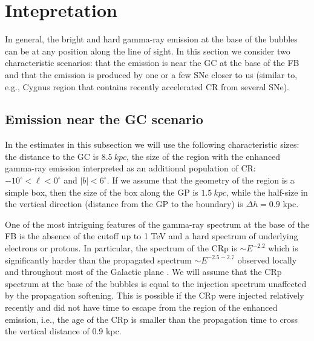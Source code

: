 \section{Intepretation}
\label{sec:Interpretation}

In general, the bright and hard gamma-ray emission at the base of the bubbles can be at any position along the line of sight.
In this section we consider two characteristic scenarios: that the emission is near the GC at the base of the FB and that the emission is 
produced by one or a few SNe closer to us (similar to, e.g., Cygnus region that contains recently accelerated CR from several SNe).

\subsection{Emission near the GC scenario}

In the estimates in this subsection we will use the following characteristic sizes: 
the distance to the GC is $\SI{8.5}{kpc}$, 
the size of the region with the enhanced gamma-ray emission interpreted as an additional population of CR:
$-10^\circ < \ell < 0^\circ$ and $|b| < 6^\circ$.
If we assume that the geometry of the region is a simple box, then the size of the box along the GP is $\SI{1.5}{kpc}$,
while the half-size in the vertical direction (distance from the GP to the boundary) is $\Delta h = 0.9$ kpc.

One of the most intriguing features of the gamma-ray spectrum at the base of the FB is the absence of the cutoff up to 1 TeV and 
a hard spectrum of underlying electrons or protons.
In particular, the spectrum of the CRp is $\sim E^{-2.2}$ which is significantly harder than the propagated spectrum
$\sim E^{-2.5 - 2.7}$ observed locally and throughout most of the Galactic plane \citep{2016ApJS..223...26A}.
We will assume that the CRp spectrum at the base of the bubbles is equal to the injection spectrum unaffected by the 
propagation softening.
This is possible if the CRp were injected relatively recently and did not have time to escape from the region of the enhanced emission,
i.e., the age of the CRp is smaller than the propagation time to cross the vertical distance of 0.9 kpc.

